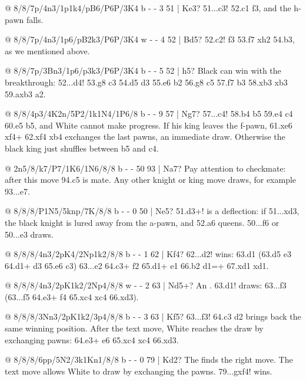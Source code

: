 @ 8/8/7p/4n3/1p1k4/pB6/P6P/3K4 b - - 3 51 | Ke3?
51...\K c3! 52.\K c1 \N f3, and the h-pawn falls.

@ 8/8/7p/4n3/1p6/pB2k3/P6P/3K4 w - - 4 52 | Bd5?
52.\K c2! \N f3 53.\B f7 \N xh2 54.\K b3, as we mentioned above.

@ 8/8/7p/3Bn3/1p6/p3k3/P6P/3K4 b - - 5 52 | h5?
Black can win with the breakthrough: 52...\K d4! 53.\B g8 \K c3 54.\B d5 \N d3 55.\B e6 \K b2 56.\B g8 \N c5
57.\B f7 b3 58.\B xb3 \N xb3 59.axb3 a2.

@ 8/8/4p3/4K2n/5P2/1k1N4/1P6/8 b - - 9 57 | Ng7?
57...\K c4! 58.b4 \K b5 59.\K e4 \K c4 60.\K e5 \K b5, and White cannot make progress. If his king
leaves the f-pawn, 61.\K xe6 \N xf4+ 62.\N xf4 \K xb4 exchanges the last pawns, an immediate
draw. Otherwise the black king just shuffles between b5
and c4.

@ 2n5/8/k7/P7/1K6/1N6/8/8 b - - 50 93 | Na7?
Pay attention to checkmate: after this move 94.\N c5 is mate. Any other knight or king move draws,
for example 93...\N e7.

@ 8/8/8/P1N5/5knp/7K/8/8 b - - 0 50 | Ne5?
51.\N d3+! is a deflection: if 51...\N xd3, the black knight is lured
away from the a-pawn, and 52.a6 queens. 50...\N f6 or 50...\N e3 draws.

@ 8/8/8/4n3/2pK4/2Np1k2/8/8 b - - 1 62 | Kf4?
62...d2! wins: 63.\N d1 (63.\K d5 \K e3 64.\N d1+ \K d3 65.\K e6 c3) 63...\K e2 64.\N c3+ \K f2
65.\N d1+ \K e1 66.\N b2 d1=\Q+ 67.\N xd1 \K xd1.

@ 8/8/8/4n3/2pK1k2/2Np4/8/8 w - - 2 63 | Nd5+?
An . 63.\N d1! draws: 63...\K f3
(63...\K f5 64.\N e3+ \K f4 65.\N xc4 \N xc4 66.\K xd3).

@ 8/8/8/3Nn3/2pK1k2/3p4/8/8 b - - 3 63 | Kf5?
63...\K f3! 64.\N c3 d2 brings back the same winning position. After the text move, White reaches
the draw by exchanging pawns: 64.\N e3+ \K e6 65.\N xc4 \N xc4 66.\K xd3.

@ 8/8/8/6pp/5N2/3k1Kn1/8/8 b - - 0 79 | Kd2?
The  finds the right move.
The text move allows White to draw by exchanging the pawns. 79...gxf4! wins.

